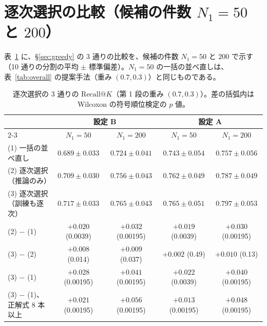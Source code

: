 \documentclass[a4j,dvipdfmx,11pt]{jresume}
\makeatletter
\newcommand{\rk}{\textrm{Recall@}K}
\makeatother
\begin{document}
\section{逐次選択の比較（候補の件数 $N_1 = 50$ と $200$）}\label{app:k50}
表~\ref{tab:k50} に、\S\ref{sec:greedy} の 3 通りの比較を、候補の件数 $N_1 = 50$ と $200$ で示す（10 通りの分割の平均 $\pm$ 標準偏差）。$N_1 = 50$ の一括の並べ直しは、表~\ref{tab:overall} の提案手法（重み $(0.7, 0.3)$）と同じものである。

\begin{table}[h]\centering
\caption{逐次選択の 3 通りの $\rk$（第 1 段の重み $(0.7, 0.3)$）。差の括弧内は Wilcoxon の符号順位検定の $p$ 値。}
\label{tab:k50}
\footnotesize
\setlength{\tabcolsep}{3.5pt}
\begin{tabular}{@{}lcccc@{}}
\toprule
 & \multicolumn{2}{c}{設定 B} & \multicolumn{2}{c}{設定 A} \\
\cmidrule{2-3}\cmidrule{4-5}
 & $N_1 = 50$ & $N_1 = 200$ & $N_1 = 50$ & $N_1 = 200$ \\
\midrule
(1) 一括の並べ直し & $0.689 \pm 0.033$ & $0.724 \pm 0.041$ & $0.743 \pm 0.054$ & $0.757 \pm 0.056$ \\
(2) 逐次選択（推論のみ） & $0.709 \pm 0.030$ & $0.756 \pm 0.043$ & $0.762 \pm 0.049$ & $0.787 \pm 0.049$ \\
(3) 逐次選択（訓練も逐次） & $0.717 \pm 0.033$ & $0.765 \pm 0.043$ & $0.765 \pm 0.051$ & $0.797 \pm 0.053$ \\
\midrule
(2) $-$ (1) & $+0.020$ (0.0039) & $+0.032$ (0.00195) & $+0.019$ (0.0039) & $+0.030$ (0.00195) \\
(3) $-$ (2) & $+0.008$ (0.014) & $+0.009$ (0.037) & $+0.002$ (0.49) & $+0.010$ (0.13) \\
(3) $-$ (1) & $+0.028$ (0.00195) & $+0.041$ (0.00195) & $+0.022$ (0.0039) & $+0.040$ (0.00195) \\
(3) $-$ (1)、正解式 8 本以上 & $+0.021$ (0.00195) & $+0.056$ (0.00195) & $+0.013$ (0.00195) & $+0.048$ (0.00195) \\
\bottomrule
\end{tabular}
\end{table}
\end{document}
